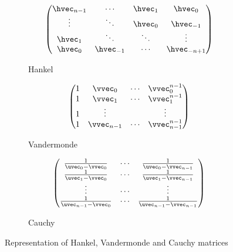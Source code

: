 \begin{figure}[t]
   \centering
   \begin{subfigure}[b]{0.32\textwidth}
       \centering
       \begin{equation*}
	  \leftmatrix
	     \hvec_{n-1} & \cdots     & \hvec_1 & \hvec_0      \\
	     \vdots      & \ddots     & \hvec_0 & \hvec_{-1}   \\
	     \hvec_1     & \ddots     & \ddots  & \vdots       \\
	     \hvec_0     & \hvec_{-1} & \cdots  & \hvec_{-n+1} \\
	  \rightmatrix
       \end{equation*}
       \caption*{Hankel}
   \end{subfigure}
   \hfill
   \begin{subfigure}[b]{0.32\textwidth}
       \centering
       \begin{equation*}
	  \leftmatrix
	    1 & \vvec_0     & \cdots & \vvec_0^{n-1} \\
	    1 & \vvec_1     & \cdots & \vvec_1^{n-1} \\
	    1 & \vdots      &        & \vdots        \\
	    1 & \vvec_{n-1} & \cdots & \vvec_{n-1}^{n-1}
	  \rightmatrix
       \end{equation*}
       \caption*{Vandermonde}
   \end{subfigure}
   \hfill
   \begin{subfigure}[b]{0.32\textwidth}
       \centering
       \begin{equation*}
	  \leftmatrix
	  \frac{1}{\uvec_0 - \vvec_{0}}     & \cdots & \frac{1}{\uvec_0 - \vvec_{n-1}} \\
	  \frac{1}{\uvec_1 - \vvec_{0}}     & \cdots & \frac{1}{\uvec_1 - \vvec_{n-1}} \\
	  \vdots                            & \cdots & \vdots                          \\
	  \frac{1}{\uvec_{n-1} - \vvec_{0}} & \cdots & \frac{1}{\uvec_{n-1} - \vvec_{n-1}}
	  \rightmatrix
       \end{equation*}
       \caption*{Cauchy}
   \end{subfigure}
   \caption{Representation of Hankel, Vandermonde and Cauchy matrices}
  \label{figure:ch2-example_structure_matrices}
\end{figure}


